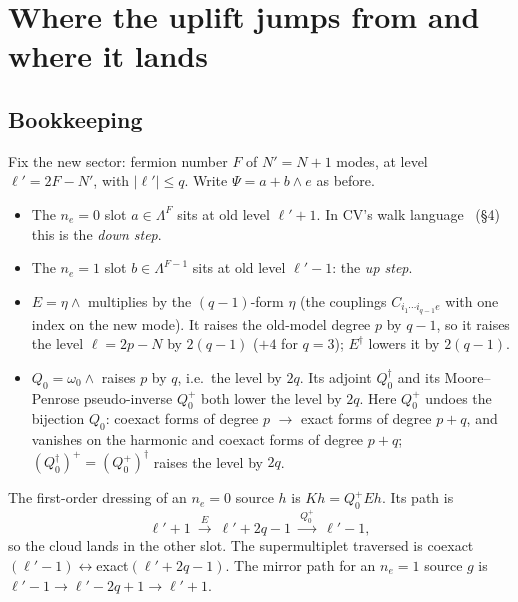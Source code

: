 \documentclass[11pt]{article}
\newcommand{\Np}{N'}
\newcommand{\lp}{\ell'}
\theoremstyle{plain}
\theoremstyle{remark}
\numberwithin{equation}{section}
\begin{document}
\section{Where the uplift jumps from and where it lands}\label{sec:book}

\subsection{Bookkeeping}
Fix the new sector: fermion number $F$ of $\Np=N+1$ modes, at level $\lp=2F-\Np$, with $|\lp|\le q$. Write
$\Psi=a+b\wedge e$ as before.
\begin{itemize}\itemsep1pt
\item The $n_e=0$ slot $a\in\Lambda^F$ sits at old level $\lp+1$. In CV's walk language~\cite{CV} (\S4) this is the
\emph{down step}.
\item The $n_e=1$ slot $b\in\Lambda^{F-1}$ sits at old level $\lp-1$: the \emph{up step}.
\item $E=\eta\wedge$ multiplies by the $(q-1)$-form $\eta$ (the couplings $C_{i_1\cdots i_{q-1}e}$ with one index on
the new mode). It raises the old-model degree $p$ by $q-1$, so it raises the level $\ell=2p-N$ by $2(q-1)$ ($+4$ for
$q=3$); $E^\dagger$ lowers it by $2(q-1)$.
\item $Q_0=\omega_0\wedge$ raises $p$ by $q$, i.e.\ the level by $2q$. Its adjoint $Q_0^\dagger$ and its Moore--Penrose
pseudo-inverse $Q_0^+$ both lower the level by $2q$. Here $Q_0^+$ undoes the bijection $Q_0$: coexact forms of degree
$p$ $\to$ exact forms of degree $p+q$, and vanishes on the harmonic and coexact forms of degree $p+q$;
$(Q_0^\dagger)^+=(Q_0^+)^\dagger$ raises the level by $2q$.
\end{itemize}
The first-order dressing of an $n_e=0$ source $h$ is $Kh=Q_0^+Eh$. Its path is
\begin{equation}\label{eq:path}
\ell'+1\ \xrightarrow{\ E\ }\ \ell'+2q-1\ \xrightarrow{\ Q_0^+\ }\ \ell'-1,
\end{equation}
so the cloud lands in the other slot. The supermultiplet traversed is coexact$(\lp-1)\leftrightarrow$exact$(\lp+2q-1)$.
The mirror path for an $n_e=1$ source $g$ is $\lp-1\to\lp-2q+1\to\lp+1$.
\end{document}
